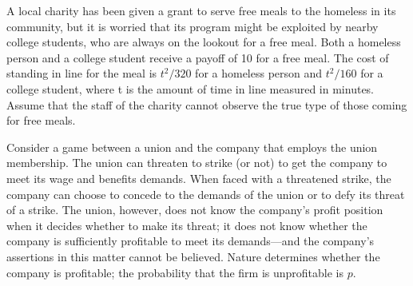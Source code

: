 \documentclass[addpoints ]{exam}
\begin{document}
\begin{questions}
\newpage


\question
A local charity has been given a grant to serve free meals to the homeless in its community, but it is worried that its program might be exploited by nearby college students, who are always on the lookout for a free meal.
Both a homeless person and a college student receive a payoff of 10 for a free meal.
The cost of standing in line for the meal is 
$t^2 / 320$ for a homeless person and 
$t^2 / 160$ for a college student,
where t is the amount of time in line measured in minutes.
Assume that the staff of the charity cannot observe the true type of those coming for free meals.



\newpage

\question
Consider a game between a union and the company that employs the union
membership. The union can threaten to strike (or not) to get the company to
meet its wage and benefits demands. When faced with a threatened strike, the
company can choose to concede to the demands of the union or to defy its threat
of a strike. The union, however, does not know the company’s profit position
when it decides whether to make its threat; it does not know whether the
company is sufficiently profitable to meet its demands—and the company’s
assertions in this matter cannot be believed. Nature determines whether the
company is profitable; the probability that the firm is unprofitable is $p$.


\end{questions}
\end{document}

